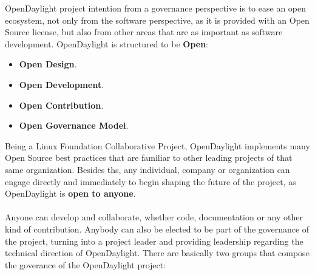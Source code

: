 \documentclass[a4paper, 12pt]{book}
\begin{document}
OpenDaylight project intention from a governance perspective is to ease an open ecosystem, not only from the software perspective, as it is provided with an Open Source license, but also from other areas that are as important as software development. OpenDaylight is structured to be \textbf{Open}:
\begin{itemize}\itemsep0pt
\item{\textbf{Open Design}}.
\item{\textbf{Open Development}}.
\item{\textbf{Open Contribution}}.
\item{\textbf{Open Governance Model}}.
\end{itemize}
Being a Linux Foundation Collaborative Project, OpenDaylight implements many Open Source best practices that are familiar to other leading projects of that same organization. Besides ths, any individual, company or organization can engage directly and immediately to begin shaping the future of the project, as OpenDaylight is \textbf{open to anyone}.\\
\\
Anyone can develop and collaborate, whether code, documentation or any other kind of contribution. Anybody can also be elected to be part of the governance of the project, turning into a project leader and providing leadership regarding the technical direction of OpenDaylight. There are basically two groups that compose the goverance of the OpenDaylight project:
\end{document}
